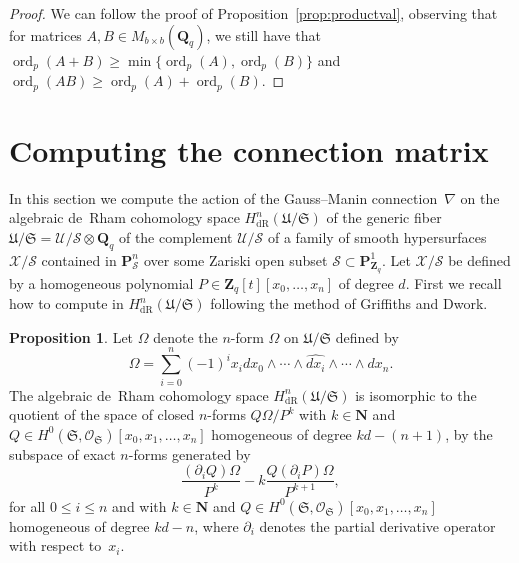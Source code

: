 \documentclass[a4paper,11pt]{article}
\numberwithin{equation}{section}
\newcommand{\NN}{\mathbf{N}} %
\newcommand{\ZZ}{\mathbf{Z}} %
\newcommand{\QQ}{\mathbf{Q}} %
\DeclareMathOperator{\ord}{ord}          %
\providecommand{\HdR}{H_{\text{dR}}}    %
\theoremstyle{definition}
\newtheorem{prop}[thm]{Proposition}
\begin{document}
\begin{proof}
We can follow the proof of Proposition~\ref{prop:productval}, 
observing that for matrices $A,B \in M_{b \times b}(\QQ_q)$, we still have that
$\ord_p(A + B) \geq \min \{\ord_p(A), \ord_p(B)\}$ and $\ord_p(AB) \geq \ord_p(A)+\ord_p(B)$.
\end{proof}

\section{Computing the connection matrix}
\label{sec:Connection}

In this section we compute the action of the Gauss--Manin connection~$\nabla$ on 
the algebraic de~Rham cohomology space $\HdR^{n}(\mathfrak{U}/\mathfrak{S})$ of the 
generic fiber $\mathfrak{U}/\mathfrak{S}=\mathcal{U}/\mathcal{S} \otimes \QQ_q$ of 
the complement $\mathcal{U}/\mathcal{S}$ of a family of smooth hypersurfaces 
$\mathcal{X}/\mathcal{S}$ contained in $\mathbf{P}^n_{\mathcal{S}}$ over
some Zariski open subset $\mathcal{S} \subset \mathbf{P}^1_{\ZZ_q}$. Let $\mathcal{X}/\mathcal{S}$ be defined
by a homogeneous polynomial $P \in \ZZ_q[t][x_0,\ldots,x_n]$ of degree $d$.
First we recall how to compute in $\HdR^{n}(\mathfrak{U}/\mathfrak{S})$ 
following the method of Griffiths and Dwork.  

\begin{prop}
Let $\Omega$ denote the $n$-form $\Omega$ on $\mathfrak{U}/\mathfrak{S}$ 
defined by 
\begin{equation*}
\Omega = \sum_{i=0}^n (-1)^i x_i d x_0 \wedge \dotsb \wedge \widehat{d x_i} \wedge \dotsb \wedge d x_n.
\end{equation*}
The algebraic de~Rham cohomology space $\HdR^{n}(\mathfrak{U}/\mathfrak{S})$ is 
isomorphic to the quotient of the space of closed $n$-forms 
$Q \Omega / P^k$ with $k \in \NN$ and $Q \in H^0(\mathfrak{S},\mathcal{O}_{\mathfrak{S}})[x_0, x_1, \dotsc, x_n]$ 
homogeneous of degree $k d - (n + 1)$, by the subspace of exact $n$-forms generated by
\begin{equation*} 
\frac{(\partial_i Q) \Omega}{P^k} - k \frac{Q (\partial_i P) \Omega}{P^{k+1}},
\end{equation*}
for all $0 \leq i \leq n$ and with $k \in \NN$ and $Q \in H^0(\mathfrak{S},\mathcal{O}_{\mathfrak{S}})[x_0, x_1, \dotsc, x_n]$ 
homogeneous of degree $kd-n$, where $\partial_i$ denotes the partial derivative operator with respect to~$x_i$.
\end{prop}
\end{document}
